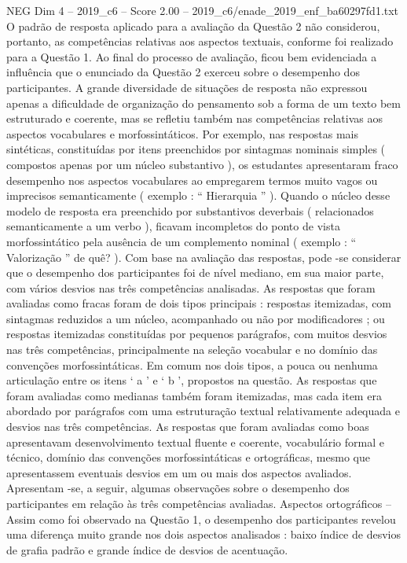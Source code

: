 \begin{textsample}{NEG Dim 4 – 2019\_c6 – Score 2.00 – 2019\_c6/enade\_2019\_enf\_ba60297fd1.txt}
O padrão de resposta aplicado para a avaliação da Questão 2 não considerou, portanto, as competências relativas aos aspectos textuais, conforme foi realizado para a Questão 1.
Ao final do processo de avaliação, ficou bem evidenciada a influência que o enunciado da Questão 2 exerceu sobre o desempenho dos participantes.
A grande diversidade de situações de resposta não expressou apenas a dificuldade de organização do pensamento sob a forma de um texto bem estruturado e coerente, mas se refletiu também nas competências relativas aos aspectos vocabulares e morfossintáticos.
Por exemplo, nas respostas mais sintéticas, constituídas por itens preenchidos por sintagmas nominais simples ( compostos apenas por um núcleo substantivo ), os estudantes apresentaram fraco desempenho nos aspectos vocabulares ao empregarem termos muito vagos ou imprecisos semanticamente ( exemplo : “ Hierarquia ” ).
Quando o núcleo desse modelo de resposta era preenchido por substantivos deverbais ( relacionados semanticamente a um verbo ), ficavam incompletos do ponto de vista morfossintático pela ausência de um complemento nominal ( exemplo : “ Valorização ” de quê? ).
Com base na avaliação das respostas, pode -se considerar que o desempenho dos participantes foi de nível mediano, em sua maior parte, com vários desvios nas três competências analisadas.
As respostas que foram avaliadas como fracas foram de dois tipos principais : respostas itemizadas, com sintagmas reduzidos a um núcleo, acompanhado ou não por modificadores ; ou respostas itemizadas constituídas por pequenos parágrafos, com muitos desvios nas três competências, principalmente na seleção vocabular e no domínio das convenções morfossintáticas.
Em comum nos dois tipos, a pouca ou nenhuma articulação entre os itens ‘ a ’ e ‘ b ’, propostos na questão.
As respostas que foram avaliadas como medianas também foram itemizadas, mas cada item era abordado por parágrafos com uma estruturação textual relativamente adequada e desvios nas três competências.
As respostas que foram avaliadas como boas apresentavam desenvolvimento textual fluente e coerente, vocabulário formal e técnico, domínio das convenções morfossintáticas e ortográficas, mesmo que apresentassem eventuais desvios em um ou mais dos aspectos avaliados.
Apresentam -se, a seguir, algumas observações sobre o desempenho dos participantes em relação às três competências avaliadas.
Aspectos ortográficos – Assim como foi observado na Questão 1, o desempenho dos participantes revelou uma diferença muito grande nos dois aspectos analisados : baixo índice de desvios de grafia padrão e grande índice de desvios de acentuação.

\end{textsample}
